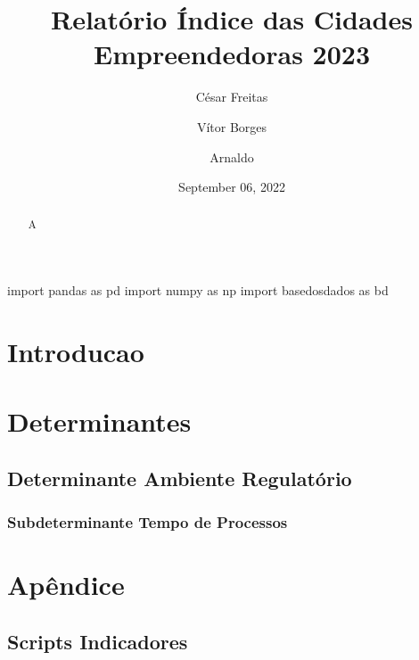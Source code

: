 \documentclass[
  12,
  dvipsnames]{article}
\title{Relatório Índice das Cidades Empreendedoras 2023}
\author{César Freitas \and Vítor Borges \and Arnaldo}
\date{September 06, 2022}
\newenvironment{Shaded}{\begin{snugshade}}{\end{snugshade}}
\newcommand{\ImportTok}[1]{#1}
\newcommand{\NormalTok}[1]{#1}
\begin{document}
\maketitle
\begin{abstract}
A
\end{abstract}

\renewcommand*\contentsname{Sumário}
{
\setcounter{tocdepth}{2}
\tableofcontents
}
\newpage

\begin{Shaded}
\begin{Highlighting}[]
\ImportTok{import}\NormalTok{ pandas }\ImportTok{as}\NormalTok{ pd}
\ImportTok{import}\NormalTok{ numpy }\ImportTok{as}\NormalTok{ np}
\ImportTok{import}\NormalTok{ basedosdados }\ImportTok{as}\NormalTok{ bd}
\end{Highlighting}
\end{Shaded}

\hypertarget{introducao}{%
\section{Introducao}\label{introducao}}

\hypertarget{determinantes}{%
\section{Determinantes}\label{determinantes}}

\hypertarget{determinante-ambiente-regulatuxf3rio}{%
\subsection{Determinante Ambiente
Regulatório}\label{determinante-ambiente-regulatuxf3rio}}

\hypertarget{subdeterminante-tempo-de-processos}{%
\subsubsection{Subdeterminante Tempo de
Processos}\label{subdeterminante-tempo-de-processos}}

\hypertarget{apend}{%
\section*{Apêndice}\label{apend}}

\hypertarget{script_ind}{%
\subsection*{Scripts Indicadores}\label{script_ind}}
\end{document}
